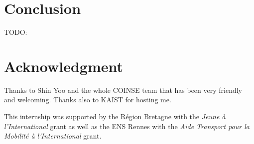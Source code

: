 \documentclass{llncs2e/llncs}
\def\todo#1{{\color{red}TODO:\quad#1}}
\begin{document}
\cite{gligoric2011smutant,haupt2011type,steinert2010continuous,yoo2012regression}%
\cite{chugh2012nested}%
\cite{chambers1991iterative}%

\cite{hayes1994testing}%

\cite{bottaci2010type} %

\section{Conclusion}
\label{conclusion}
\todo{}


\section*{Acknowledgment}
Thanks to Shin Yoo and the whole COINSE team that has been very friendly and
welcoming. Thanks also to KAIST for hosting me.

This internship was supported by the R\'egion Bretagne with the \textit{Jeune
\`a l'International} grant as well as the ENS Rennes with the \textit{Aide
Transport pour la Mobilit\'e \`a l'International} grant.



\end{document}
